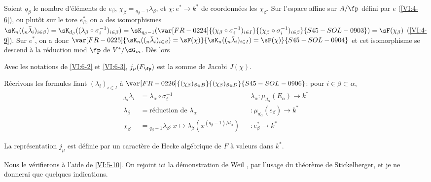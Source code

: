 Soient $q_\beta$ le nombre d'éléments de $e_\beta$, 
$\chi_\beta={}_{q_\beta-1}\lambda_\beta$, et 
$\chi:e^\ast \to k^\ast$ de coordonnées les $\chi_\beta$. Sur l'espace 
affine sur $A/\fp$ défini par $e$ (\ref{VI:4-6}), ou plutôt sur le tore 
$e_\beta^\ast$, on a des isomorphismes 
$\sK_n((_n\bar\lambda_i)_{i\in\beta}) = \sK_{d_\beta}((\lambda_\beta \circ \sigma_i^{-1})_{i\in\beta}) =\sK_{q_\beta-1}(\var[FR-0224]{(\chi_\beta\circ \sigma_i^{-1})_{i\in I}}{(\chi_\beta\circ \sigma_i^{-1})_{i\in\beta}}{S45-SOL-0903}) = \sF(\chi_\beta)$ (\ref{VI:4-9}). 
Sur $e^\ast$, on a donc $\var[FR-0225]{\sK_n((_n\bar\lambda_i)_{i\in \beta}) = \sF(\chi)}{\sK_n((_n\bar\lambda_i)_{i\in I}) = \sF(\chi)}{S45-SOL-0904}$ 
et cet isomorphisme se descend à la réduction mod $\fp$ de $V^\ast/\dG_m$. 
Dès lors





\begin{proposition_}\label{VI:6-4}
Avec les notations de \ref{VI:6-2} et \ref{VI:6-3}, $j_\mu(F_\fp)$ est la 
somme de Jacobi $J(\chi)$. 
\end{proposition_}

Récrivons les formules liant $(\lambda_i)_{i\in I}$ à 
$\var[FR-0226]{(\chi_\beta)_{\beta\in B}}{(\chi_\beta)_{\beta\in D}}{S45-SOL-0906}$: pour $i\in \beta\subset \alpha$, 
\begin{align*}
  _{d_\alpha} \lambda_i &= \lambda_\alpha\circ \sigma_i^{-1} && \lambda_\alpha:\mu_{d_\alpha}(E_\alpha) \to k^\ast \\
  \lambda_\beta &= \text{réduction de $\lambda_\alpha$} && :\mu_{d_\alpha}(e_\beta) \to k^\ast \\
  \chi_\beta &= {}_{q_\beta-1}\lambda_\beta: x\mapsto \lambda_\beta(x^{(q_\beta-1)/d_\alpha}) && :e_\beta^\ast \to k^\ast 
\end{align*}





\begin{theorem_}\label{VI:6-5}
La représentation $j_\mu$ est définie par un caractère de Hecke 
algébrique de $F$ à valeurs dans $k^\ast$. 
\end{theorem_}

Nous le vérifierons à l'aide de \ref{VI:5-10}. On rejoint ici la 
démonstration de Weil , par l'usage du théorème de 
Stickelberger, et je ne donnerai que quelques indications. 





